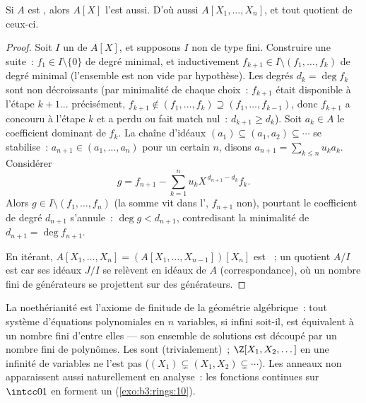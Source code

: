 \begin{theorem}\label{thm:b3:rings:hilbert}
Si $A$ est , alors $A[X]$ l'est aussi. D'où aussi
$A[X_1, \dots, X_n]$, et tout quotient de ceux-ci.
\end{theorem}

\begin{proof}
Soit $I$ un  de $A[X]$, et supposons $I$ non de type fini.
Construire une suite~: $f_1 \in I \setminus \{0\}$ de degré
minimal, et inductivement $f_{k+1} \in I \setminus (f_1, \dots,
f_k)$ de degré minimal (l'ensemble est non vide par
hypothèse). Les degrés $d_k = \deg f_k$ sont non décroissants
(par minimalité de chaque choix~: $f_{k+1}$ était disponible à
l'étape $k+1$... précisément, $f_{k+1} \notin (f_1,\dots,f_k)
\supseteq (f_1, \dots, f_{k-1})$, donc $f_{k+1}$ a concouru à
l'étape $k$ et a perdu ou fait match nul~: $d_{k+1} \geq d_k$).
Soit $a_k \in A$ le coefficient dominant de $f_k$. La chaîne
d'idéaux $(a_1) \subseteq (a_1, a_2) \subseteq \cdots$ se
stabilise~: $a_{n+1} \in (a_1, \dots, a_n)$ pour un certain $n$,
disons $a_{n+1} = \sum_{k\leq n} u_k a_k$. Considérer
\[
g = f_{n+1} - \sum_{k=1}^{n} u_k X^{\,d_{n+1} - d_k} f_k .
\]
Alors $g \in I \setminus (f_1, \dots, f_n)$ (la somme vit dans
l', $f_{n+1}$ non), pourtant le coefficient de degré
$d_{n+1}$ s'annule~: $\deg g < d_{n+1}$, contredisant la
minimalité de $d_{n+1} = \deg f_{n+1}$.

En itérant, $A[X_1, \dots, X_n] = (A[X_1, \dots, X_{n-1}])[X_n]$
est ~; un quotient $A/I$ est  car ses idéaux
$J/I$ se relèvent en idéaux de $A$ (correspondance), où un
nombre fini de générateurs se projettent sur des générateurs.
\end{proof}

\begin{remark}\label{rem:b3:rings:noethmeaning}
La noethérianité est l'axiome de finitude de la géométrie
algébrique~: tout système d'équations polynomiales en $n$
variables, si infini soit-il, est équivalent à un nombre fini
d'entre elles --- son ensemble de solutions est découpé par un
nombre fini de polynômes. Les  sont 
(trivialement)~; $\Z[X_1, X_2, \dots]$ en une infinité de
variables ne l'est pas ($(X_1) \subsetneq (X_1, X_2) \subsetneq
\cdots$). Les anneaux non  apparaissent aussi
naturellement en analyse~: les fonctions continues sur
$\intcc01$ en forment un (\cref{exo:b3:rings:10}).
\end{remark}

